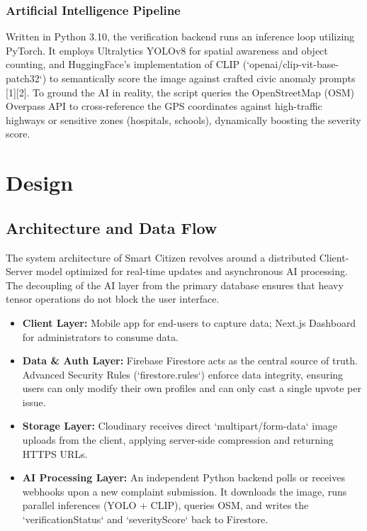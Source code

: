 \documentclass[12pt,a4paper]{report}
\begin{document}
\subsection{Artificial Intelligence Pipeline}
Written in Python 3.10, the verification backend runs an inference loop utilizing PyTorch. It employs Ultralytics YOLOv8 for spatial awareness and object counting, and HuggingFace's implementation of CLIP (`openai/clip-vit-base-patch32`) to semantically score the image against crafted civic anomaly prompts [1][2]. To ground the AI in reality, the script queries the OpenStreetMap (OSM) Overpass API to cross-reference the GPS coordinates against high-traffic highways or sensitive zones (hospitals, schools), dynamically boosting the severity score.

\chapter{Design}
\section{Architecture and Data Flow}
The system architecture of Smart Citizen revolves around a distributed Client-Server model optimized for real-time updates and asynchronous AI processing. The decoupling of the AI layer from the primary database ensures that heavy tensor operations do not block the user interface.

\begin{itemize}
    \item \textbf{Client Layer:} Mobile app for end-users to capture data; Next.js Dashboard for administrators to consume data.
    \item \textbf{Data \& Auth Layer:} Firebase Firestore acts as the central source of truth. Advanced Security Rules (`firestore.rules`) enforce data integrity, ensuring users can only modify their own profiles and can only cast a single upvote per issue.
    \item \textbf{Storage Layer:} Cloudinary receives direct `multipart/form-data` image uploads from the client, applying server-side compression and returning HTTPS URLs.
    \item \textbf{AI Processing Layer:} An independent Python backend polls or receives webhooks upon a new complaint submission. It downloads the image, runs parallel inferences (YOLO + CLIP), queries OSM, and writes the `verificationStatus` and `severityScore` back to Firestore.
\end{itemize}
\end{document}
